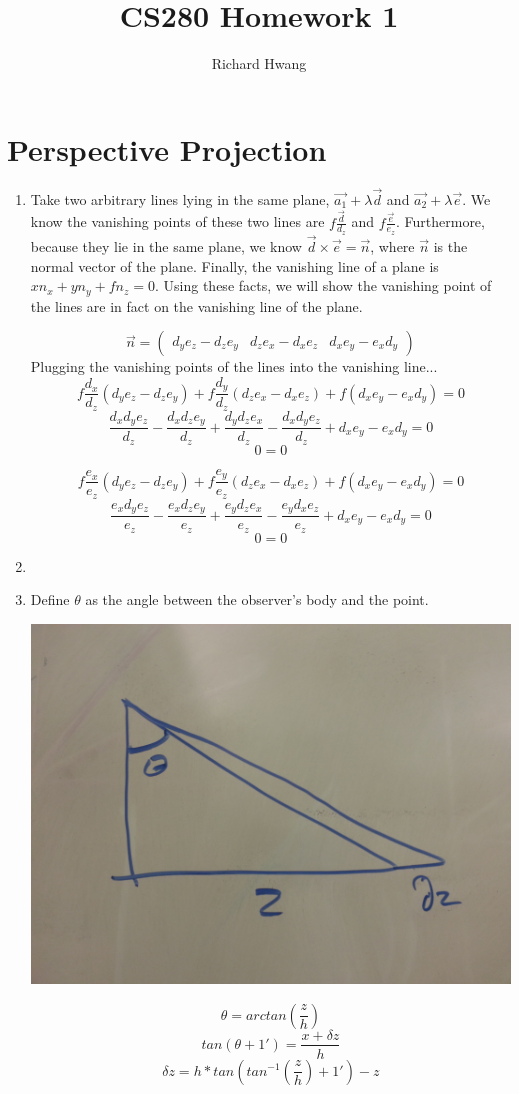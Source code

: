 \documentclass[11pt]{article}
\begin{document}
\title{CS280 Homework 1}
\author{Richard Hwang}
\maketitle

\section{Perspective Projection}
\begin{enumerate}
\item
    Take two arbitrary lines lying in the same plane,
    $\vec{a_1} + \lambda\vec{d}$ and $\vec{a_2} + \lambda\vec{e}$.  We know
    the vanishing points of these two lines are $f\frac{\vec{d}}{d_z}$ and
    $f\frac{\vec{e}}{e_z}$. Furthermore, because they lie in the same plane, we
    know $\vec{d} \times \vec{e} = \vec{n}$, where $\vec{n}$ is the normal
    vector of the plane. Finally, the vanishing line of a plane is
    $xn_x + yn_y + fn_z = 0$.  Using these facts, we will show the vanishing
    point of the lines are in fact on the vanishing line of the plane.

    $$\vec{n} = \begin{pmatrix}d_ye_z - d_ze_y&d_ze_x-d_xe_z&d_xe_y-e_xd_y\end{pmatrix}$$
    Plugging the vanishing points of the lines into the vanishing line...
    $$f\frac{d_x}{d_z}(d_ye_z - d_ze_y) + f\frac{d_y}{d_z}(d_ze_x-d_xe_z)
    + f(d_xe_y-e_xd_y) = 0$$
    $$\frac{d_xd_ye_z}{d_z} - \frac{d_xd_ze_y}{d_z} + \frac{d_yd_ze_x}{d_z} -
    \frac{d_xd_ye_z}{d_z} + d_xe_y - e_xd_y= 0$$
    $$0 = 0$$

    $$f\frac{e_x}{e_z}(d_ye_z - d_ze_y) + f\frac{e_y}{e_z}(d_ze_x-d_xe_z)
    + f(d_xe_y-e_xd_y) = 0$$
    $$\frac{e_xd_ye_z}{e_z} - \frac{e_xd_ze_y}{e_z} + \frac{e_yd_ze_x}{e_z} -
    \frac{e_yd_xe_z}{e_z} + d_xe_y - e_xd_y= 0$$
    $$0 = 0$$

\item
\item
    Define $\theta$ as the angle between the observer's body and the point.

    \includegraphics[width=0.5\linewidth]{./../img/delta_z.jpg}

    $$\theta = arctan(\frac{z}{h})$$
    $$tan(\theta + 1') = \frac{x + \delta z}{h}$$
    $$\delta z = h*tan(tan^{-1}(\frac{z}{h}) + 1') - z$$
\end{enumerate}
\newpage
\end{document}
